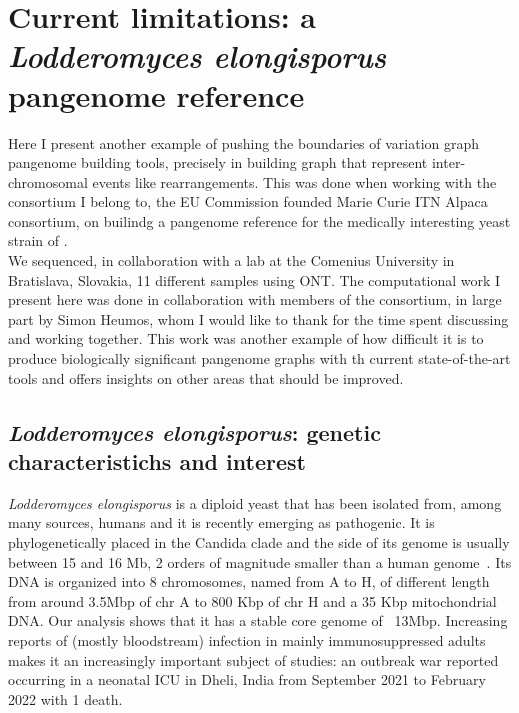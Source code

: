 \section{Current limitations: a \emph{Lodderomyces elongisporus} pangenome reference}
Here I present another example of pushing the boundaries of variation graph pangenome building tools, precisely in building graph that represent inter-chromosomal events like rearrangements. This was done when working with the consortium I belong to, the EU Commission founded Marie Curie ITN Alpaca consortium, on builindg a pangenome reference for the medically interesting yeast strain of \lodelo. \\
We sequenced, in collaboration with a lab at the Comenius University in Bratislava, Slovakia, 11 different samples using ONT. The computational work I present here was done in collaboration with members of the consortium, in large part by Simon Heumos, whom I would like to thank for the time spent discussing and working together.
This work was another example of how difficult it is to produce biologically significant pangenome graphs with th current state-of-the-art tools and offers insights on other areas that should be improved. 

\subsection{\emph{Lodderomyces elongisporus}: genetic characteristichs and interest}
\emph{Lodderomyces elongisporus} is a diploid yeast that has been isolated from, among many sources, humans and it is recently emerging as pathogenic. It is phylogenetically placed in the Candida clade and the side of its genome is usually between 15 and 16 Mb, 2 orders of magnitude smaller than a human genome~\cite{Lodderomyces}. Its DNA is organized into 8 chromosomes, named from A to H, of different length from around 3.5Mbp of chr A to 800 Kbp of chr H and a 35 Kbp mitochondrial DNA. Our analysis shows that it has a stable core genome of ~13Mbp.
Increasing reports of (mostly bloodstream) infection in mainly immunosuppressed adults makes it an increasingly important subject of studies: an outbreak war reported occurring in a neonatal ICU in Dheli, India from September 2021 to February 2022 with 1 death\cite{lodelo_india}.
